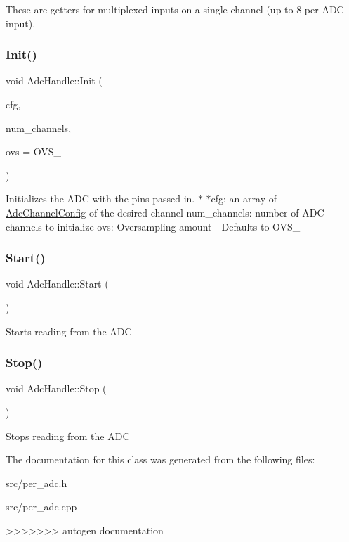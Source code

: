 These are getters for multiplexed inputs on a single channel (up to 8 per A\+DC input). \mbox{\label{classdaisy_1_1_adc_handle_ab518149ca03a1dda0273dab1afd74ac6}} 
\subsubsection{\texorpdfstring{Init()}{Init()}}
{\footnotesize\ttfamily void Adc\+Handle\+::\+Init (\begin{DoxyParamCaption}\item[{\hyperlink{structdaisy_1_1_adc_channel_config}{Adc\+Channel\+Config} $\ast$}]{cfg,  }\item[{size\+\_\+t}]{num\+\_\+channels,  }\item[{Over\+Sampling}]{ovs = {\ttfamily OVS\+\_} }\end{DoxyParamCaption})}

Initializes the A\+DC with the pins passed in. $\ast$ $\ast$cfg\+: an array of \hyperlink{structdaisy_1_1_adc_channel_config}{Adc\+Channel\+Config} of the desired channel num\+\_\+channels\+: number of A\+DC channels to initialize ovs\+: Oversampling amount -\/ Defaults to O\+V\+S\+\_ \mbox{\label{classdaisy_1_1_adc_handle_aef1669d0f168bd10ca94f6e540f31fe1}} 
\subsubsection{\texorpdfstring{Start()}{Start()}}
{\footnotesize\ttfamily void Adc\+Handle\+::\+Start (\begin{DoxyParamCaption}{ }\end{DoxyParamCaption})}

Starts reading from the A\+DC \mbox{\label{classdaisy_1_1_adc_handle_a4a5e05d15b1f26ce80e997c75fb5d3dc}} 
\subsubsection{\texorpdfstring{Stop()}{Stop()}}
{\footnotesize\ttfamily void Adc\+Handle\+::\+Stop (\begin{DoxyParamCaption}{ }\end{DoxyParamCaption})}

Stops reading from the A\+DC 

The documentation for this class was generated from the following files\+:\begin{DoxyCompactItemize}
\item 
src/per\+\_\+adc.\+h\item 
src/per\+\_\+adc.\+cpp\end{DoxyCompactItemize}
>>>>>>> autogen documentation
